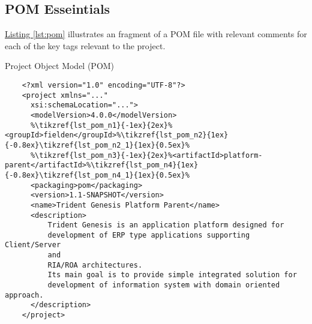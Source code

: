   \subsection*{POM Esseintials}  

  \hyperref[lst:pom]{Listing \ref{lst:pom}} illustrates an fragment of a POM file with relevant comments for each of the key tags relevant to the project.


  \clearpage
  \begin{code}{Project Object Model (POM)}{\label{lst:pom}}
    \begin{lstlisting}
    <?xml version="1.0" encoding="UTF-8"?>
    <project xmlns="..."
	  xsi:schemaLocation="...">
	  <modelVersion>4.0.0</modelVersion>
	  %\tikzref{lst_pom_n1}{-1ex}{2ex}%<groupId>fielden</groupId>%\tikzref{lst_pom_n2}{1ex}{-0.8ex}\tikzref{lst_pom_n2_1}{1ex}{0.5ex}%
	  %\tikzref{lst_pom_n3}{-1ex}{2ex}%<artifactId>platform-parent</artifactId>%\tikzref{lst_pom_n4}{1ex}{-0.8ex}\tikzref{lst_pom_n4_1}{1ex}{0.5ex}%
	  <packaging>pom</packaging>
	  <version>1.1-SNAPSHOT</version>
	  <name>Trident Genesis Platform Parent</name>
	  <description>
		  Trident Genesis is an application platform designed for
		  development of ERP type applications supporting Client/Server
		  and
		  RIA/ROA architectures.
		  Its main goal is to provide simple integrated solution for 
		  development of information system with domain oriented approach. 
	  </description>
    </project> 
    \end{lstlisting}
  \end{code}


